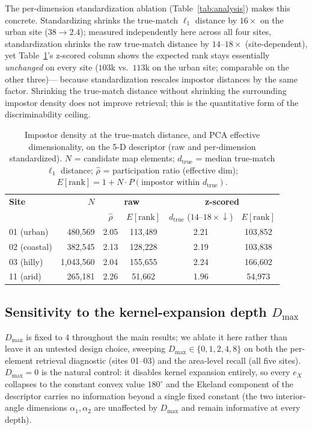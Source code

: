 \documentclass[10pt]{article}
\theoremstyle{plain}
\theoremstyle{definition}
\begin{document}
The per-dimension standardization ablation (Table~\ref{tab:analysis}) makes
this concrete. Standardizing shrinks the true-match $\ell_1$ distance by
$16\times$ on the urban site ($38\!\to\!2.4$); measured independently here
across all four sites, standardization shrinks the raw true-match distance by
$14$--$18\times$ (site-dependent), yet Table~\ref{tab:impostor}'s z-scored
column shows the expected rank stays essentially \emph{unchanged} on every
site ($103$k vs.\ $113$k on the urban site; comparable on the other three)---
because standardization rescales impostor distances by the same factor.
Shrinking the true-match distance without shrinking the surrounding impostor
density does not improve retrieval; this is the quantitative form of the
discriminability ceiling.

\begin{table}[htbp]
\caption{Impostor density at the true-match distance, and PCA effective
  dimensionality, on the 5-D descriptor (raw and per-dimension standardized).
  $N$ = candidate map elements; $d_{\mathrm{true}}$ = median true-match
  $\ell_1$ distance; $\hat{\rho}$ = participation ratio (effective dim);
  $E[\text{rank}] = 1 + N\!\cdot\!P(\text{impostor within } d_{\mathrm{true}})$.}
\label{tab:impostor}
\centering\small
\setlength{\tabcolsep}{4pt}
\begin{tabular}{lrcccc}
\toprule
\textbf{Site} & \textbf{$N$} & \multicolumn{2}{c}{\textbf{raw}} & \multicolumn{2}{c}{\textbf{z-scored}} \\
 & & $\hat{\rho}$ & $E[\text{rank}]$ & $d_{\mathrm{true}}$ ($14$--$18\times\!\downarrow$) & $E[\text{rank}]$ \\
\midrule
01 (urban)   & 480{,}569   & 2.05 & 113{,}489 & 2.21 & 103{,}852 \\
02 (coastal) & 382{,}545   & 2.13 & 128{,}228 & 2.19 & 103{,}838 \\
03 (hilly)   & 1{,}043{,}560 & 2.04 & 155{,}655 & 2.24 & 166{,}602 \\
11 (arid)    & 265{,}181   & 2.26 & 51{,}662  & 1.96 & 54{,}973 \\
\bottomrule
\end{tabular}
\end{table}

\subsection{Sensitivity to the kernel-expansion depth $D_{\max}$}
\label{sec:dmax}

$D_{\max}$ is fixed to $4$ throughout the main results; we ablate it here
rather than leave it an untested design choice, sweeping
$D_{\max}\in\{0,1,2,4,8\}$ on both the per-element retrieval diagnostic
(sites 01--03) and the area-level recall (all five sites). $D_{\max}=0$ is
the natural control: it disables kernel expansion entirely, so every $e_X$
collapses to the constant convex value $180^\circ$ and the Ekeland
component of the descriptor carries no information beyond a single fixed
constant (the two interior-angle dimensions $\alpha_1,\alpha_2$ are
unaffected by $D_{\max}$ and remain informative at every depth).
\end{document}
